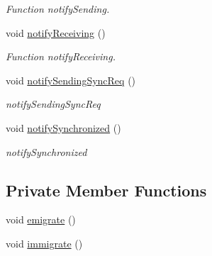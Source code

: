\begin{CompactItemize}
\begin{CompactList}\small\item\em Function notify\-Sending. \item\end{CompactList}\item 
\hypertarget{classpeoSyncIslandMig_75aacd3f7ffbc302c69addc342f45b8f}{
void \hyperlink{classpeoSyncIslandMig_75aacd3f7ffbc302c69addc342f45b8f}{notify\-Receiving} ()}
\label{classpeoSyncIslandMig_75aacd3f7ffbc302c69addc342f45b8f}

\begin{CompactList}\small\item\em Function notify\-Receiving. \item\end{CompactList}\item 
\hypertarget{classpeoSyncIslandMig_92fef53496f935fe450589f90aec7d72}{
void \hyperlink{classpeoSyncIslandMig_92fef53496f935fe450589f90aec7d72}{notify\-Sending\-Sync\-Req} ()}
\label{classpeoSyncIslandMig_92fef53496f935fe450589f90aec7d72}

\begin{CompactList}\small\item\em notify\-Sending\-Sync\-Req \item\end{CompactList}\item 
\hypertarget{classpeoSyncIslandMig_0abd0c5872195cea0cab4988f9a4ea4e}{
void \hyperlink{classpeoSyncIslandMig_0abd0c5872195cea0cab4988f9a4ea4e}{notify\-Synchronized} ()}
\label{classpeoSyncIslandMig_0abd0c5872195cea0cab4988f9a4ea4e}

\begin{CompactList}\small\item\em notify\-Synchronized \item\end{CompactList}\end{CompactItemize}
\subsection*{Private Member Functions}
\begin{CompactItemize}
\item 
\hypertarget{classpeoSyncIslandMig_3ab202cb311f67fdc827078b3bdfddf4}{
void \hyperlink{classpeoSyncIslandMig_3ab202cb311f67fdc827078b3bdfddf4}{emigrate} ()}
\label{classpeoSyncIslandMig_3ab202cb311f67fdc827078b3bdfddf4}

\item 
\hypertarget{classpeoSyncIslandMig_baed2215bf06f96aacf06b5abff79f28}{
void \hyperlink{classpeoSyncIslandMig_baed2215bf06f96aacf06b5abff79f28}{immigrate} ()}
\label{classpeoSyncIslandMig_baed2215bf06f96aacf06b5abff79f28}

\end{CompactItemize}

